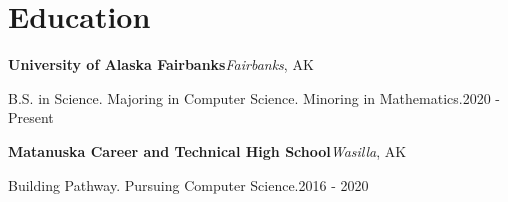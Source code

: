 ﻿\section{Education}

{\textbf{University of Alaska Fairbanks}}\hfill{\textit{Fairbanks}, AK}

{B.S. in Science. Majoring in Computer Science. Minoring in Mathematics.}\hfill{2020 - Present}

\bigbreak

{\textbf{Matanuska Career and Technical High School}}\hfill{\textit{Wasilla}, AK}

{Building Pathway. Pursuing Computer Science.}\hfill{2016 - 2020}